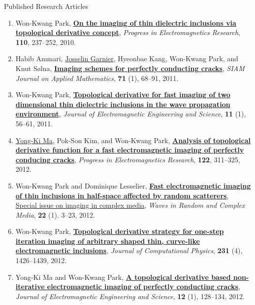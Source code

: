 \documentclass{resume} %
\begin{document}
\begin{rSection}{Published Research Articles}
\begin{enumerate}
\item\label{A-PIER2010B} Won-Kwang Park, \href{http://dx.doi.org/10.2528/PIER10101305}{\textbf{On the imaging of thin dielectric inclusions via topological derivative concept}}, \textit{Progress in Electromagnetics Research}, \textbf{110}, 237--252, 2010.
\item\label{A-SIAP2011} Habib Ammari, \href{http://www.lpma-paris.fr/pageperso/garnier/}{Josselin Garnier}, Hyeonbae Kang, Won-Kwang Park, and Knut S\o lna, \href{http://dx.doi.org/10.1137/100800130}{\textbf{Imaging schemes for perfectly conducting cracks}}, \textit{SIAM Journal on Applied Mathematics}, \textbf{71} (1), 68--91, 2011.
\item\label{A-JEES2011} Won-Kwang Park, \href{http://dx.doi.org/10.5515/JKIEES.2011.11.1.056}{\textbf{Topological derivative for fast imaging of two dimensional thin dielectric inclusions in the wave propagation environment}}, \textit{Journal of Electromagnetic Engineering and Science}, \textbf{11} (1), 56--61, 2011.
\item\label{A-PIER2012} \href{https://apmath08.cafe24.com/pro06}{Yong-Ki Ma}, Pok-Son Kim, and Won-Kwang Park, \href{http://dx.doi.org/10.2528/PIER11092901}{\textbf{Analysis of topological derivative function for a fast electromagnetic imaging of perfectly conducing cracks}}, \textit{Progress in Electromagnetics Research}, \textbf{122}, 311--325, 2012.
\item\label{A-WRCM2012} Won-Kwang Park and Dominique Lesselier, \href{http://dx.doi.org/10.1080/17455030.2010.536854}{\textbf{Fast electromagnetic imaging of thin inclusions in half-space affected by random scatterers}}, \href{https://doi.org/10.1080/17455030.2012.645138}{Special issue on imaging in complex media}, \textit{Waves in Random and Complex Media}, \textbf{22} (1). 3--23, 2012.
\item\label{A-JCOMP2012} Won-Kwang Park, \href{http://dx.doi.org/10.1016/j.jcp.2011.10.014}{\textbf{Topological derivative strategy for one-step iteration imaging of arbitrary shaped thin, curve-like electromagnetic inclusions}}, \textit{Journal of Computational Physics}, \textbf{231} (4), 1426--1439, 2012.
\item\label{A-JEES2012} Yong-Ki Ma and Won-Kwang Park, \href{http://dx.doi.org/10.5515/JKIEES.2012.12.1.128}{\textbf{A topological derivative based non-iterative electromagnetic imaging of perfectly conducting cracks}}, \textit{Journal of Electromagnetic Engineering and Science},  \textbf{12} (1), 128--134, 2012.

\end{enumerate}
\end{rSection}
\end{document}
